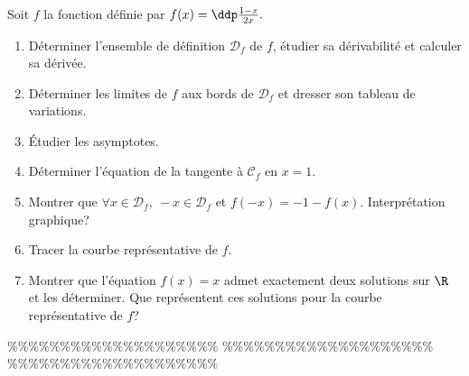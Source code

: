 



\begin{exercice}  \;
Soit $f$ la fonction définie par $f(x)=\ddp\frac{1-x}{2x}.$
\begin{enumerate}
\item Déterminer l'ensemble de définition $\mathcal{D}_f$ de $f$, étudier sa dérivabilité et calculer sa dérivée.
\item Déterminer les limites de $f$ aux bords de $\mathcal{D}_f$ et dresser son tableau de variations.
\item \'Etudier les asymptotes.
\item Déterminer l'équation de la tangente \`{a} $\mathcal{C}_f$ en $x=1$.
\item Montrer que $\forall x\in\mathcal{D}_f,\ -x\in\mathcal{D}_f$ et $f(-x)=-1-f(x)$. Interprétation graphique?
\item Tracer la courbe représentative de $f$.
\item Montrer que l'équation $f(x)=x$ admet exactement deux solutions sur $\R$ et les déterminer.
Que représentent ces solutions pour la courbe représentative de $f$? \end{enumerate}
\end{exercice}


\%\%\%\%\%\%\%\%\%\%\%\%\%\%\%\%\%\%\%\%
\%\%\%\%\%\%\%\%\%\%\%\%\%\%\%\%\%\%\%\%
\%\%\%\%\%\%\%\%\%\%\%\%\%\%\%\%\%\%\%\%



